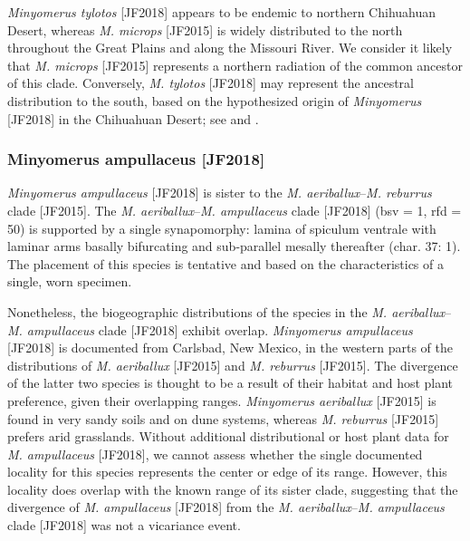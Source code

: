 \documentclass[fleqn,10pt,lineno]{wlpeerj} %
\begin{document}
			\textit{Minyomerus tylotos} [JF2018] appears to be endemic to northern Chihuahuan Desert, whereas \textit{M. microps} [JF2015] is widely distributed to the north throughout the Great Plains and along the Missouri River.
			We consider it likely that \textit{M. microps} [JF2015] represents a northern radiation of the common ancestor of this clade.
			Conversely, \textit{M. tylotos} [JF2018] may represent the ancestral distribution to the south, based on the hypothesized origin of \textit{Minyomerus} [JF2018] in the Chihuahuan Desert; see \citet{jansen2015} and \citealt{wilson2010}.
			
		\subsubsection*{Minyomerus ampullaceus \textnormal{\bfseries[JF2018]}}
			\textit{Minyomerus ampullaceus} [JF2018] is sister to the \textit{M. aeriballux}--\textit{M. reburrus} clade [JF2015].
			The \textit{M. aeriballux}--\textit{M. ampullaceus} clade [JF2018] (bsv = 1, rfd = 50) is supported by a single synapomorphy: lamina of spiculum ventrale with laminar arms basally bifurcating and sub-parallel mesally thereafter (char. 37: 1).
			The placement of this species is tentative and based on the characteristics of a single, worn specimen.
			
			Nonetheless, the biogeographic distributions of the species in the \textit{M. aeriballux}--\textit{M. ampullaceus} clade [JF2018] exhibit overlap.
			\textit{Minyomerus ampullaceus} [JF2018] is documented from Carlsbad, New Mexico, in the western parts of the distributions of \textit{M. aeriballux} [JF2015] and \textit{M. reburrus} [JF2015]. 
			The divergence of the latter two species is thought to be a result of their habitat and host plant preference, given their overlapping ranges.
			\textit{Minyomerus aeriballux} [JF2015] is found in very sandy soils and on dune systems, whereas \textit{M. reburrus} [JF2015] prefers arid grasslands.
			Without additional distributional or host plant data for \textit{M. ampullaceus} [JF2018], we cannot assess whether the single documented locality for this species represents the center or edge of its range.
			However, this locality does overlap with the known range of its sister clade, suggesting that the divergence of \textit{M. ampullaceus} [JF2018] from the \textit{M. aeriballux}--\textit{M. ampullaceus} clade [JF2018] was not a vicariance event.
			
\end{document}
